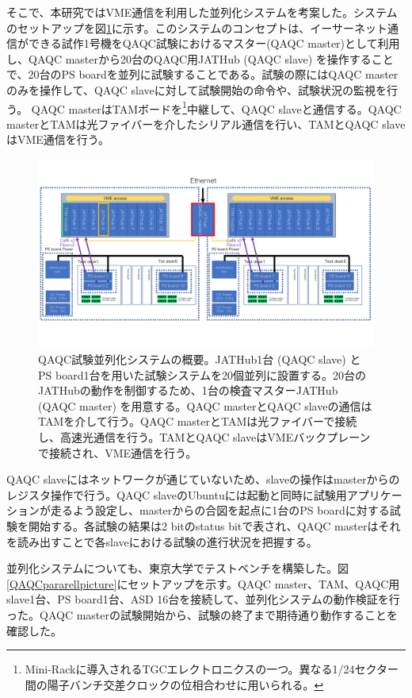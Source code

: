 そこで、本研究ではVME通信を利用した並列化システムを考案した。システムのセットアップを図\ref{QAQCpararell}に示す。このシステムのコンセプトは、イーサーネット通信ができる試作1号機をQAQC試験におけるマスター(QAQC master)として利用し、QAQC masterから20台のQAQC用JATHub (QAQC slave) を操作することで、20台のPS boardを並列に試験することである。試験の際にはQAQC masterのみを操作して、QAQC slaveに対して試験開始の命令や、試験状況の監視を行う。
QAQC masterはTAMボードを\footnote{Mini-Rackに導入されるTGCエレクトロニクスの一つ。異なる1/24セクター間の陽子バンチ交差クロックの位相合わせに用いられる。}中継して、QAQC slaveと通信する。QAQC masterとTAMは光ファイバーを介したシリアル通信を行い、TAMとQAQC slaveはVME通信を行う。

\begin{figure} 
    \centering
    \includegraphics[width=16cm]{fig/QAQC/QAQCpararell.pdf}
    \caption[並列化システムの概要]{QAQC試験並列化システムの概要。JATHub1台 (QAQC slave) とPS board1台を用いた試験システムを20個並列に設置する。20台のJATHubの動作を制御するため、1台の検査マスターJATHub (QAQC master) を用意する。QAQC masterとQAQC slaveの通信はTAMを介して行う。QAQC masterとTAMは光ファイバーで接続し、高速光通信を行う。TAMとQAQC slaveはVMEバックプレーンで接続され、VME通信を行う。}
    \label{QAQCpararell}
\end{figure}

QAQC slaveにはネットワークが通じていないため、slaveの操作はmasterからのレジスタ操作で行う。QAQC slaveのUbuntuには起動と同時に試験用アプリケーションが走るよう設定し、masterからの合図を起点に1台のPS boardに対する試験を開始する。各試験の結果は2 bitのstatus bitで表され、QAQC masterはそれを読み出すことで各slaveにおける試験の進行状況を把握する。

並列化システムについても、東京大学でテストベンチを構築した。図\ref{QAQCpararellpicture}にセットアップを示す。QAQC master、TAM、QAQC用 slave1台、PS board1台、ASD 16台を接続して、並列化システムの動作検証を行った。QAQC masterの試験開始から、試験の終了まで期待通り動作することを確認した。

